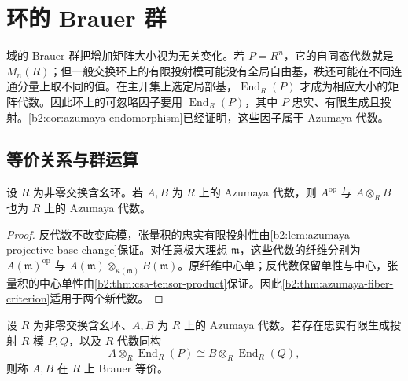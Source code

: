 

\section{环的 Brauer 群}
\label{b2:sec:C03}

域的 Brauer 群把增加矩阵大小视为无关变化。若 \(P=R^n\)，它的自同态代数就是 \(M_n(R)\)；但一般交换环上的有限投射模可能没有全局自由基，秩还可能在不同连通分量上取不同的值。在主开集上选定局部基，\(\operatorname{End}_R(P)\) 才成为相应大小的矩阵代数。因此环上的可忽略因子要用 \(\operatorname{End}_R(P)\)，其中 \(P\) 忠实、有限生成且投射。\cref{b2:cor:azumaya-endomorphism}已经证明，这些因子属于 Azumaya 代数。

\subsection{等价关系与群运算}
\label{b2:subsec:C03:01}

\begin{proposition}\label{b2:prop:azumaya-tensor-opposite}
	设 \(R\) 为非零交换含幺环。若 \(A,B\) 为 \(R\) 上的 Azumaya 代数，则 \(A^{\mathrm{op}}\) 与 \(A\otimes_RB\) 也为 \(R\) 上的 Azumaya 代数。
\end{proposition}
\begin{proof}
	反代数不改变底模，张量积的忠实有限投射性由\cref{b2:lem:azumaya-projective-base-change}保证。对任意极大理想 \(\mathfrak m\)，这些代数的纤维分别为 \(A(\mathfrak m)^{\mathrm{op}}\) 与 \(A(\mathfrak m)\otimes_{\kappa(\mathfrak m)}B(\mathfrak m)\)。原纤维中心单；反代数保留单性与中心，张量积的中心单性由\cref{b2:thm:csa-tensor-product}保证。因此\cref{b2:thm:azumaya-fiber-criterion}适用于两个新代数。
\end{proof}

\begin{definition}\label{b2:def:ring-brauer-equivalence}
	设 \(R\) 为非零交换含幺环、\(A,B\) 为 \(R\) 上的 Azumaya 代数。若存在忠实有限生成投射 \(R\) 模 \(P,Q\)，以及 \(R\) 代数同构
	\begin{equation}\label{b2:eq:ring-brauer-equivalence}
		A\otimes_R\operatorname{End}_R(P) \cong B\otimes_R\operatorname{End}_R(Q),
	\end{equation}
	则称 \(A,B\) 在 \(R\) 上 Brauer 等价。
\end{definition}

